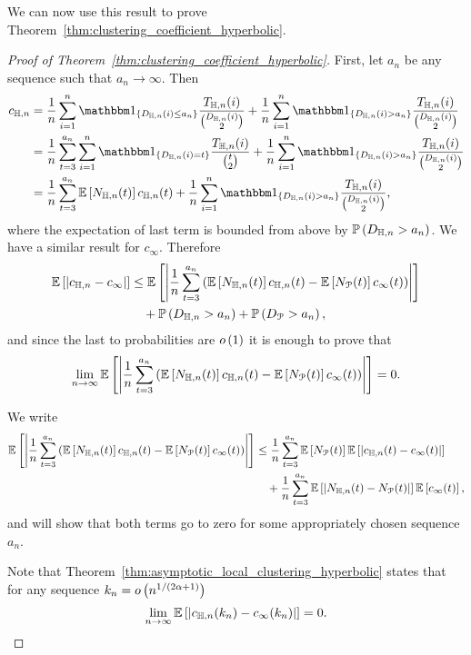 We can now use this result to prove Theorem~\ref{thm:clustering_coefficient_hyperbolic}.

\begin{proof}[Proof of Theorem~\ref{thm:clustering_coefficient_hyperbolic}]
First, let $a_n$ be any sequence such that $a_n \to \infty$. Then
\begin{align*}
	c_{\H,n} &= \frac{1}{n} \sum_{i = 1}^n \ind{D_{\H,n}(i) \le a_n} \frac{T_{\H,n}(i)}{\binom{D_{\H,n}(i)}{2}}
		+ \frac{1}{n} \sum_{i = 1}^n \ind{D_{\H,n}(i) > a_n} \frac{T_{\H,n}(i)}{\binom{D_{\H,n}(i)}{2}}\\
	&= \frac{1}{n} \sum_{t = 3}^{a_n} \sum_{i = 1}^n \ind{D_{\H,n}(i) = t} \frac{T_{\H,n}(i)}{\binom{t}{2}}
		+ \frac{1}{n} \sum_{i = 1}^n \ind{D_{\H,n}(i) > a_n} \frac{T_{\H,n}(i)}{\binom{D_{\H,n}(i)}{2}}\\
	&= \frac{1}{n} \sum_{t = 3}^{a_n} \Exp{N_{\H,n}(t)} c_{\H,n}(t)
		+ \frac{1}{n} \sum_{i = 1}^n \ind{D_{\H,n}(i) > a_n} \frac{T_{\H,n}(i)}{\binom{D_{\H,n}(i)}{2}},
\end{align*}
where the expectation of last term is bounded from above by $\mathbb{P}\left(D_{\mathbb{H},n} > a_n\right)$. We have a similar result for $c_\infty$. Therefore
\begin{align*}
	\mathbb{E}\left[|c_{\mathbb{H},n} - c_\infty|\right]
	&\le \mathbb{E}\left[\left|\frac{1}{n} \sum_{t = 3}^{a_n} \left(\mathbb{E}\left[N_{\mathbb{H},n}(t)\right] c_{\mathbb{H},n}(t) - 	
		\mathbb{E}\left[N_{{\mathcal P}}(t)\right]c_{\infty}(t)\right)\right|\right]\\ 
	&\hspace{10pt}+ \mathbb{P}\left(D_{\mathbb{H},n} > a_n\right) + \mathbb{P}\left(D_{{\mathcal P}} > a_n\right),
\end{align*}
and since the last to probabilities are $o\left(1\right)$ it is enough to prove that
\[
	\lim_{n \to \infty} \mathbb{E}\left[\left|\frac{1}{n} \sum_{t = 3}^{a_n} \left(\mathbb{E}\left[N_{\mathbb{H},n}(t)\right] c_{\mathbb{H},n}(t) - 	
			\mathbb{E}\left[N_{{\mathcal P}}(t)\right]c_{\infty}(t)\right)\right|\right] = 0.
\]

We write
\begin{align*}
	\mathbb{E}\left[\left|\frac{1}{n} \sum_{t = 3}^{a_n} \left(\mathbb{E}\left[N_{\mathbb{H},n}(t)\right] c_{\mathbb{H},n}(t) - 	
		\mathbb{E}\left[N_{{\mathcal P}}(t)\right]c_{\infty}(t)\right)\right|\right]
	&\le \frac{1}{n} \sum_{t = 3}^{a_n} \mathbb{E}\left[N_{{\mathcal P}}(t)\right] \mathbb{E}\left[\left|c_{\mathbb{H},n}(t) - c_{\infty}(t)\right|\right]\\
	&\hspace{10pt}+ \frac{1}{n} \sum_{t = 3}^{a_n} \mathbb{E}\left[\left|N_{\mathbb{H},n}(t) - N_{{\mathcal P}}(t)\right|\right]\mathbb{E}\left[c_\infty(t)\right],
\end{align*}
and will show that both terms go to zero for some appropriately chosen sequence $a_n$.

Note that Theorem~\ref{thm:asymptotic_local_clustering_hyperbolic} states that for any sequence $k_n  = o\left(n^{1/(2\alpha + 1)}\right)$
\[
	\lim_{n \to \infty} \mathbb{E}\left[\left|c_{\mathbb{H},n}(k_n) - c_{\infty}(k_n)\right|\right] = 0.
\]


\end{proof}
